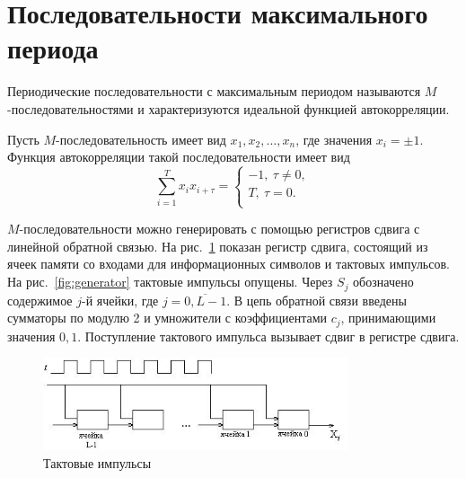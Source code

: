 \section{Последовательности максимального периода}
\label{section:max-seq}

Периодические последовательности с максимальным периодом называются $M$-последовательностями и характеризуются идеальной функцией автокорреляции.

Пусть $M$-последовательность имеет вид $x_1, x_2, \dots, x_n$, где значения $x_{i} = \pm 1$. Функция автокорреляции такой последовательности имеет вид
\[
    \sum\limits_{i=1}^{T} x_i x_{i + \tau}  = \left\{ \begin{array}{l}
        -1, ~ \tau \neq 0, \\
        T, ~ \tau = 0. \\
    \end{array} \right.
\]

$M$-последовательности можно генерировать с помощью регистров сдвига с линейной обратной связью. На рис.~\ref{fig:impulse} показан регистр сдвига, состоящий из ячеек памяти со входами для информационных символов и тактовых импульсов. На рис.~\ref{fig:generator} тактовые импульсы опущены. Через $S_{j}$ обозначено содержимое $j$-й ячейки, где $j=\overline{0,L-1}$. В цепь обратной связи введены сумматоры по модулю 2 и умножители с коэффициентами $c_{j}$, принимающими значения $0,1$. Поступление тактового импульса вызывает сдвиг в регистре сдвига.
\begin{figure}[!ht]
	\centering
    \includegraphics[width=0.8\textwidth]{pic/taktovi-impuls}
    \caption{Тактовые импульсы\label{fig:impulse}}
\end{figure}

